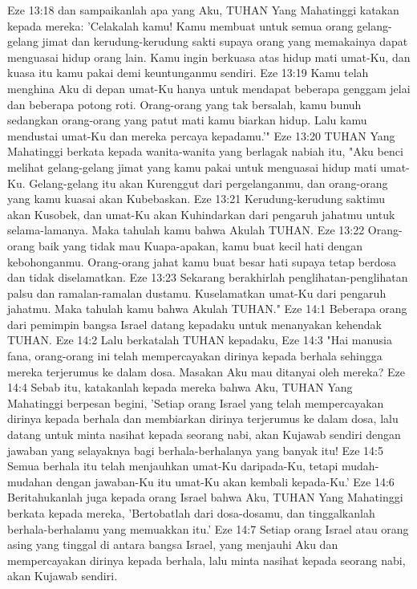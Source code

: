 Eze 13:18  dan sampaikanlah apa yang Aku, TUHAN Yang Mahatinggi katakan kepada mereka: 'Celakalah kamu! Kamu membuat untuk semua orang gelang-gelang jimat dan kerudung-kerudung sakti supaya orang yang memakainya dapat menguasai hidup orang lain. Kamu ingin berkuasa atas hidup mati umat-Ku, dan kuasa itu kamu pakai demi keuntunganmu sendiri.
Eze 13:19  Kamu telah menghina Aku di depan umat-Ku hanya untuk mendapat beberapa genggam jelai dan beberapa potong roti. Orang-orang yang tak bersalah, kamu bunuh sedangkan orang-orang yang patut mati kamu biarkan hidup. Lalu kamu mendustai umat-Ku dan mereka percaya kepadamu.'"
Eze 13:20  TUHAN Yang Mahatinggi berkata kepada wanita-wanita yang berlagak nabiah itu, "Aku benci melihat gelang-gelang jimat yang kamu pakai untuk menguasai hidup mati umat-Ku. Gelang-gelang itu akan Kurenggut dari pergelanganmu, dan orang-orang yang kamu kuasai akan Kubebaskan.
Eze 13:21  Kerudung-kerudung saktimu akan Kusobek, dan umat-Ku akan Kuhindarkan dari pengaruh jahatmu untuk selama-lamanya. Maka tahulah kamu bahwa Akulah TUHAN.
Eze 13:22  Orang-orang baik yang tidak mau Kuapa-apakan, kamu buat kecil hati dengan kebohonganmu. Orang-orang jahat kamu buat besar hati supaya tetap berdosa dan tidak diselamatkan.
Eze 13:23  Sekarang berakhirlah penglihatan-penglihatan palsu dan ramalan-ramalan dustamu. Kuselamatkan umat-Ku dari pengaruh jahatmu. Maka tahulah kamu bahwa Akulah TUHAN."
Eze 14:1  Beberapa orang dari pemimpin bangsa Israel datang kepadaku untuk menanyakan kehendak TUHAN.
Eze 14:2  Lalu berkatalah TUHAN kepadaku,
Eze 14:3  "Hai manusia fana, orang-orang ini telah mempercayakan dirinya kepada berhala sehingga mereka terjerumus ke dalam dosa. Masakan Aku mau ditanyai oleh mereka?
Eze 14:4  Sebab itu, katakanlah kepada mereka bahwa Aku, TUHAN Yang Mahatinggi berpesan begini, 'Setiap orang Israel yang telah mempercayakan dirinya kepada berhala dan membiarkan dirinya terjerumus ke dalam dosa, lalu datang untuk minta nasihat kepada seorang nabi, akan Kujawab sendiri dengan jawaban yang selayaknya bagi berhala-berhalanya yang banyak itu!
Eze 14:5  Semua berhala itu telah menjauhkan umat-Ku daripada-Ku, tetapi mudah-mudahan dengan jawaban-Ku itu umat-Ku akan kembali kepada-Ku.'
Eze 14:6  Beritahukanlah juga kepada orang Israel bahwa Aku, TUHAN Yang Mahatinggi berkata kepada mereka, 'Bertobatlah dari dosa-dosamu, dan tinggalkanlah berhala-berhalamu yang memuakkan itu.'
Eze 14:7  Setiap orang Israel atau orang asing yang tinggal di antara bangsa Israel, yang menjauhi Aku dan mempercayakan dirinya kepada berhala, lalu minta nasihat kepada seorang nabi, akan Kujawab sendiri.
